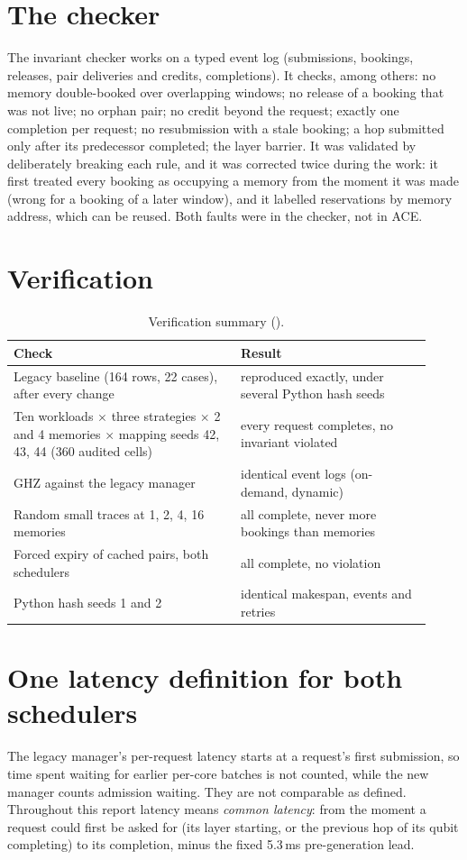 \section{The checker}
The invariant checker works on a typed event log (submissions, bookings, releases, pair deliveries and credits, completions). It checks, among
others: no memory double-booked over overlapping windows; no release of a booking that was not live; no orphan pair; no credit beyond the
request; exactly one completion per request; no resubmission with a stale booking; a hop submitted only after its predecessor completed;
the layer barrier. It was validated by deliberately breaking each rule, and it was corrected twice during the work: it first treated every
booking as occupying a memory from the moment it was made (wrong for a booking of a later window), and it labelled reservations by memory
address, which can be reused. Both faults were in the checker, not in ACE.

\section{Verification}
\begin{table}[H]
\centering\small
\begin{tabular}{@{}p{0.5\linewidth}p{0.42\linewidth}@{}}
\toprule
Check & Result \\ \midrule
Legacy baseline (164 rows, 22 cases), after every change & reproduced exactly, under several Python hash seeds \\
Ten workloads $\times$ three strategies $\times$ 2 and 4 memories $\times$ mapping seeds 42, 43, 44 (360 audited cells) & every request completes, no invariant violated \\
GHZ against the legacy manager & identical event logs (on-demand, dynamic) \\
Random small traces at 1, 2, 4, 16 memories & all complete, never more bookings than memories \\
Forced expiry of cached pairs, both schedulers & all complete, no violation \\
Python hash seeds 1 and 2 & identical makespan, events and retries \\
\bottomrule
\end{tabular}
\caption{Verification summary ().}
\end{table}

\section{One latency definition for both schedulers}
The legacy manager's per-request latency starts at a request's first submission, so time spent waiting for earlier per-core batches is not
counted, while the new manager counts admission waiting. They are not comparable as defined. Throughout this report latency means
\emph{common latency}: from the moment a request could first be asked for (its layer starting, or the previous hop of its qubit completing)
to its completion, minus the fixed 5.3\,ms pre-generation lead.

